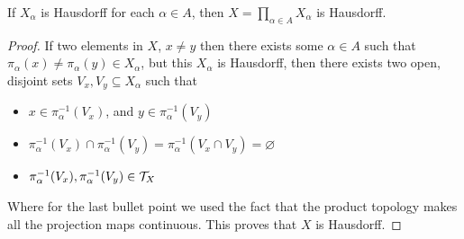 \documentclass[../../main.tex]{subfiles}
\begin{document}
\begin{wts}
    If $X_\alpha$ is Hausdorff for each $\alpha\in A$, then $X=\prod_{\alpha\in A}X_\alpha$ is Hausdorff.
\end{wts}
\newcommand{\pimap}[2]{\pi_{#1}({#2})}
\newcommand{\pinverse}[2]{\pi_{#1}^{-1}({#2})}
\begin{proof}
If two elements in $X$, $x\neq y$ then there exists some $\alpha\in A$ such that $\pimap{\alpha}{x}\neq\pimap{\alpha}{y}\in X_\alpha$, but this $X_\alpha$ is Hausdorff, then there exists two open, disjoint sets $V_x, V_y\subseteq X_\alpha$ such that
\begin{itemize}
    \item $x\in \pinverse{\alpha}{V_x}$, and $y\in \pinverse{\alpha}{V_y}$
    \item $\pinverse{\alpha}{V_x}\cap\pinverse{\alpha}{V_y} = \pinverse{\alpha}{V_x\cap V_y}=\varnothing$
    \item $\pinverse{\alpha}{V_x},\pinverse{\alpha}{V_y}\in \Tau_X$
\end{itemize}
Where for the last bullet point we used the fact that the product topology makes all the projection maps continuous. This proves that $X$ is Hausdorff.
\end{proof}
\end{document}
